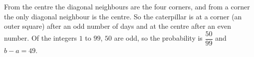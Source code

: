 From the centre the diagonal neighbours are the four corners, and from a corner the only diagonal neighbour is the centre. So the caterpillar is at a corner (an outer square) after an odd number of days and at the centre after an even number. Of the integers $1$ to $99$, $50$ are odd, so the probability is $\dfrac{50}{99}$ and $b-a=\boxed{49}$.
